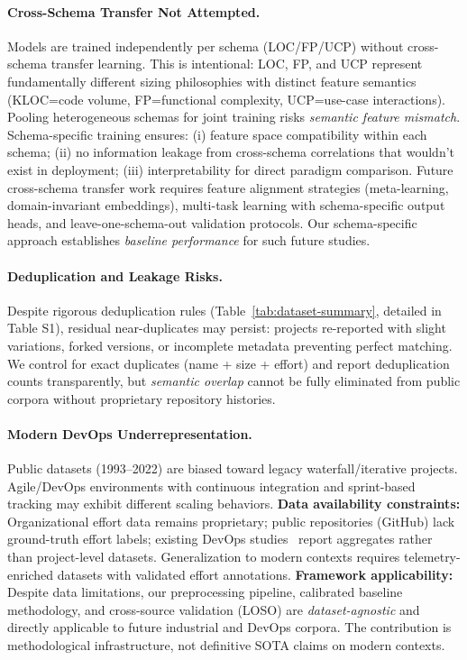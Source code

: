 \documentclass{ieeeaccess}
\begin{document}
\paragraph{Cross-Schema Transfer Not Attempted.}
Models are trained independently per schema (LOC/FP/UCP) without cross-schema transfer learning. This is intentional: LOC, FP, and UCP represent fundamentally different sizing philosophies with distinct feature semantics (KLOC=code volume, FP=functional complexity, UCP=use-case interactions). Pooling heterogeneous schemas for joint training risks \textit{semantic feature mismatch}.
Schema-specific training ensures: (i) feature space compatibility within each schema; (ii) no information leakage from cross-schema correlations that wouldn't exist in deployment; (iii) interpretability for direct paradigm comparison.
Future cross-schema transfer work requires feature alignment strategies (meta-learning, domain-invariant embeddings), multi-task learning with schema-specific output heads, and leave-one-schema-out validation protocols. Our schema-specific approach establishes \textit{baseline performance} for such future studies.

\paragraph{Deduplication and Leakage Risks.}
Despite rigorous deduplication rules (Table~\ref{tab:dataset-summary}, detailed in Table S1), residual near-duplicates may persist: projects re-reported with slight variations, forked versions, or incomplete metadata preventing perfect matching.
We control for exact duplicates (name + size + effort) and report deduplication counts transparently, but \textit{semantic overlap} cannot be fully eliminated from public corpora without proprietary repository histories.

\paragraph{Modern DevOps Underrepresentation.}
Public datasets (1993--2022) are biased toward legacy waterfall/iterative projects. Agile/DevOps environments with continuous integration and sprint-based tracking may exhibit different scaling behaviors. \textbf{Data availability constraints:} Organizational effort data remains proprietary; public repositories (GitHub) lack ground-truth effort labels; existing DevOps studies~\cite{fox2017devops,chen2020devops} report aggregates rather than project-level datasets. Generalization to modern contexts requires telemetry-enriched datasets with validated effort annotations.
\textbf{Framework applicability:} Despite data limitations, our preprocessing pipeline, calibrated baseline methodology, and cross-source validation (LOSO) are \emph{dataset-agnostic} and directly applicable to future industrial and DevOps corpora. The contribution is methodological infrastructure, not definitive SOTA claims on modern contexts.
\end{document}
